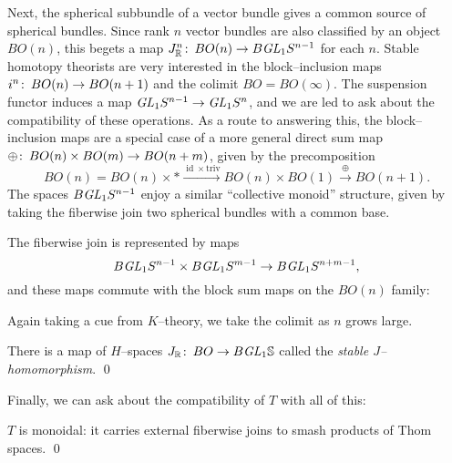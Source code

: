 Next, the spherical subbundle of a vector bundle gives a common source of spherical bundles.  Since rank $n$ vector bundles are also classified by an object $BO(n)$, this begets a map $J_{\mathbb R}^n\colon\thinspace BO(n) \to B \mathit{GL}_1 S^{n-1}$ for each $n$.  Stable homotopy theorists are very interested in the block--inclusion maps $i^n\colon\thinspace BO(n) \to BO(n+1)$ and the colimit $BO = BO(\infty)$.  The suspension functor induces a map $\mathit{GL}_1 S^{n-1} \to \mathit{GL}_1 S^n$, and we are led to ask about the compatibility of these operations.  As a route to answering this, the block--inclusion maps are a special case of a more general direct sum map $\oplus\colon\thinspace BO(n) \times BO(m) \to BO(n+m)$, given by the precomposition \[BO(n) = BO(n) \times * \xrightarrow{\operatorname{id} \times \text{triv}} BO(n) \times BO(1) \xrightarrow\oplus BO(n+1).\] The spaces $B \mathit{GL}_1 S^{n-1}$ enjoy a similar ``collective monoid'' structure, given by taking the fiberwise join two spherical bundles with a common base.
\begin{lemma}
The fiberwise join is represented by maps \[B\mathit{GL}_1 S^{n-1} \times B\mathit{GL}_1 S^{m-1} \to B\mathit{GL}_1 S^{n+m-1},\] and these maps commute with the block sum maps on the $BO(n)$ family:  
\begin{center}
\end{center}
\end{lemma}
\noindent Again taking a cue from $K$--theory, we take the colimit as $n$ grows large.
\begin{corollary}
There is a map of $H$--spaces $J_{\mathbb R}\colon\thinspace BO \to B\mathit{GL}_1 \mathbb S$ called the \textit{stable $J$--homomorphism}. \qed
\end{corollary}
\noindent Finally, we can ask about the compatibility of $T$ with all of this:
\begin{lemma}\label{ThomSpacesAreMonoidal}
$T$ is monoidal: it carries external fiberwise joins to smash products of Thom spaces. \qed
\end{lemma}

